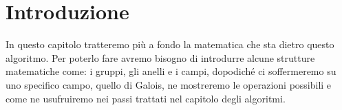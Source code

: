 







\section{Introduzione}

\textsf{\small In questo capitolo tratteremo più a fondo la matematica che sta dietro questo algoritmo. Per poterlo fare avremo bisogno di introdurre alcune strutture matematiche come: i gruppi, gli anelli e i campi, dopodiché ci soffermeremo su uno specifico campo, quello di Galois, ne mostreremo le operazioni possibili e come ne usufruiremo nei passi trattati nel capitolo degli algoritmi.}


\newpage


